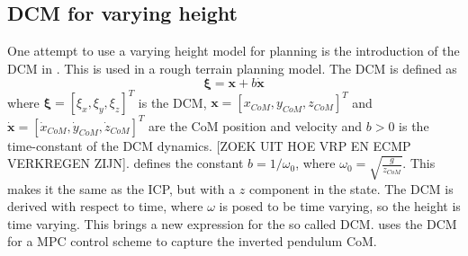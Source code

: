 \subsection{\ac{DCM} for varying height}
One attempt to use a varying height model for planning is the introduction of the \ac{DCM} in \cite{englsberger2013three}. This is used in a rough terrain planning model. The \ac{DCM} is defined as
\begin{equation}
\boldsymbol{\xi} = \boldsymbol{x} + b\boldsymbol{\dot{x}}
\end{equation}
where $\boldsymbol{\xi}=[\xi_x,\xi_y,\xi_z]^T$ is the \ac{DCM}, $\boldsymbol{x}=[x_{CoM}, y_{CoM}, z_{CoM}]^T$ and $\boldsymbol{\dot{x}}=[\dot{x}_{CoM}, \dot{y}_{CoM}, \dot{z}_{CoM}]^T$ are the \ac{CoM} position and velocity and $b>0$ is the time-constant of the \ac{DCM} dynamics. 
[ZOEK UIT HOE VRP EN ECMP VERKREGEN ZIJN].
\cite{hopkins2014humanoid} defines the constant $b=1/\omega_0$, where $\omega_0=\sqrt{\frac{g}{z_{CoM}}}$. This makes it the same as the \ac{ICP}, but with a $z$ component in the state. The \ac{DCM} is derived with respect to time, where $\omega$ is posed to be time varying, so the height is time varying. This brings a new expression for the so called \ac{DCM}.
\cite{caron2018capturability} uses the \ac{DCM} for a MPC control scheme to capture the inverted pendulum \ac{CoM}.

